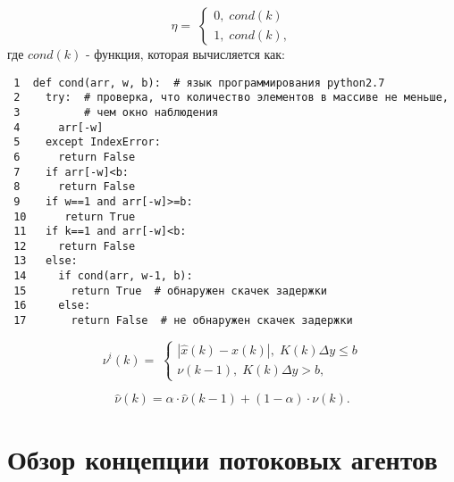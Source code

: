 \begin{equation}\label{eq3:syntes2}
\eta= \;
\begin{cases}
0, \; cond(k) \\    
1, \; cond(k),    
\end{cases}
\end{equation}
\noindent где $cond(k)$ - функция, которая вычисляется как:
\begin{verbatim}
 1  def cond(arr, w, b):  # язык программирования python2.7
 2    try:  # проверка, что количество элементов в массиве не меньше,
 3          # чем окно наблюдения
 4      arr[-w] 
 5    except IndexError:
 6      return False
 7    if arr[-w]<b:
 8      return False
 9    if w==1 and arr[-w]>=b:
 10      return True
 11   if k==1 and arr[-w]<b:
 12     return False
 13   else:
 14     if cond(arr, w-1, b):
 15       return True  # обнаружен скачек задержки
 16     else:
 17       return False  # не обнаружен скачек задержки
\end{verbatim}

\begin{equation}\label{eq3:syntes3}
\nu^i(k)= \;
\begin{cases}
| \hat{x}(k)-x(k) |, \; K(k)\Delta y \leq b \\    
\nu(k-1), \;  K(k)\Delta y > b,    
\end{cases}
\end{equation}

\begin{equation}\label{eq3:syntes4}
\hat{\nu}(k)=\alpha\cdot\hat{\nu}(k-1)+(1-\alpha)\cdot \nu(k).
\end{equation}




\section{Обзор концепции потоковых агентов} \label{sect_sa}



